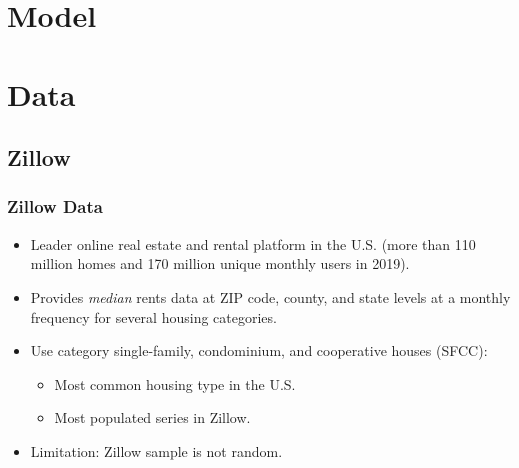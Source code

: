 \documentclass[aspectratio=169]{beamer}
\begin{document}
\begin{frame}
\begin{columns}
\begin{column}{0.50\textwidth}
\begin{figure}
            \end{figure}   
        \end{column}
    \end{columns}
\end{frame}

\section{Model}

\section{Data}

\subsection{Zillow}

\begin{frame}[label = zillow]
	\frametitle{Zillow Data}
	
	\begin{itemize}
		\item Leader online real estate and rental platform in the U.S. {\small (more 
		than 110 million homes and 170 million unique monthly users in 2019).}
		
		\vspace{2mm} \item
		Provides \textit{median} rents data at ZIP code, county, and state levels 
		at a monthly frequency for several housing categories.
		
		\pause
		\vspace{2mm} \item
		Use category single-family, condominium, and cooperative houses (SFCC):
		\begin{itemize}
			\item Most common housing type in the U.S.
			\item Most populated series in Zillow.
		\end{itemize}
		
		\pause
		\vspace{2mm} \item
		Limitation: Zillow sample is not random.
	\end{itemize}
\end{frame}
\end{document}
